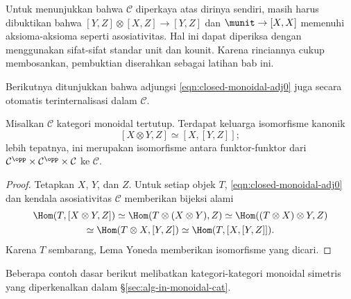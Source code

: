 Untuk menunjukkan bahwa $\mathcal{C}$ diperkaya atas dirinya sendiri, masih
harus dibuktikan bahwa $[Y,Z]\otimes[X,Z]\to[Y,Z]$ dan
$\munit\to[X,X]$ memenuhi aksioma-aksioma seperti asosiativitas. Hal ini dapat
diperiksa dengan menggunakan sifat-sifat standar unit dan kounit. Karena
rinciannya cukup membosankan, pembuktian diserahkan sebagai latihan bab ini.

Berikutnya ditunjukkan bahwa adjungsi
\eqref{eqn:closed-monoidal-adj0} juga secara otomatis terinternalisasi dalam
$\mathcal{C}$.

\begin{proposition}\label{prop:closed-monoidal-adj}
	Misalkan $\mathcal{C}$ kategori monoidal tertutup. Terdapat keluarga
	isomorfisme kanonik
	\[ [X \otimes Y, Z] \simeq [X, [Y, Z]]; \]
	lebih tepatnya, ini merupakan isomorfisme antara funktor-funktor dari
	$\mathcal{C}^{\opp}\times\mathcal{C}^{\opp}\times\mathcal{C}$ ke
	$\mathcal{C}$.
\end{proposition}

\begin{proof}
	Tetapkan $X$, $Y$, dan $Z$. Untuk setiap objek $T$,
	\eqref{eqn:closed-monoidal-adj0} dan kendala asosiativitas $\mathcal{C}$
	memberikan bijeksi alami
	\begin{multline*}
		\Hom(T, [X \otimes Y, Z]) \simeq \Hom(T \otimes (X \otimes Y), Z) \simeq \Hom((T \otimes X) \otimes Y, Z) \\
		\simeq \Hom(T \otimes X, [Y, Z]) \simeq \Hom(T, [X, [Y, Z]]).
	\end{multline*}
	Karena $T$ sembarang, Lema Yoneda memberikan isomorfisme yang dicari.
\end{proof}

Beberapa contoh dasar berikut melibatkan kategori-kategori monoidal simetris
yang diperkenalkan dalam \S\ref{sec:alg-in-monoidal-cat}.

